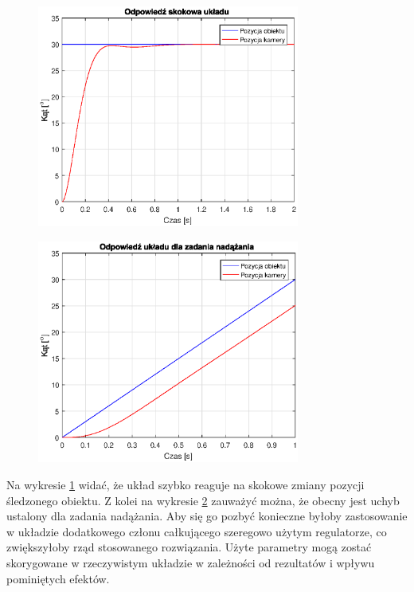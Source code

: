 \begin{figure}[H]
	\centering
	\includegraphics[width=3.4in]{sim_step.eps}
\label{fig:sim_step}
\end{figure}

\begin{figure}[H]
	\centering
	\includegraphics[width=3.4in]{sim_ramp.eps}
\label{fig:sim_ramp}
\end{figure}

Na wykresie \ref{fig:sim_step} widać, że układ szybko reaguje na skokowe zmiany pozycji śledzonego obiektu. Z kolei na wykresie \ref{fig:sim_ramp} zauważyć można, że obecny jest uchyb ustalony dla zadania nadążania. Aby się go pozbyć konieczne byłoby zastosowanie w układzie dodatkowego członu całkującego szeregowo użytym regulatorze, co zwiększyłoby rząd stosowanego rozwiązania. Użyte parametry mogą zostać skorygowane w rzeczywistym układzie w zależności od rezultatów i wpływu pominiętych efektów.